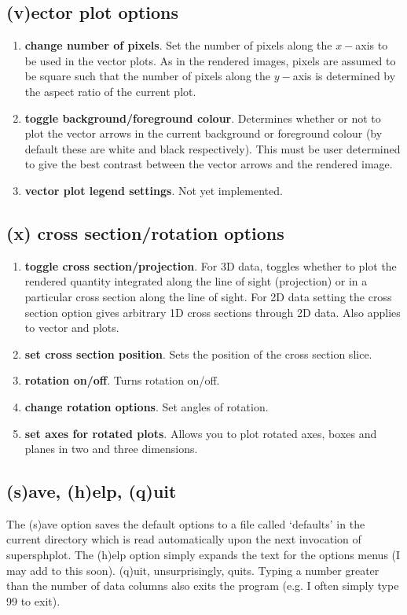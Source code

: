 \documentclass[a4paper,11pt]{article}
\begin{document}
\subsection{(v)ector plot options}
\begin{enumerate}
\item \textbf{change number of pixels}. Set the number of pixels along the
$x-$axis to be used in the vector plots. As in the rendered images, pixels are assumed to be square such that the number of pixels along
the $y-$axis is determined by the aspect ratio of the current plot.
\item \textbf{toggle background/foreground colour}. Determines whether or not to
plot the vector arrows in the current background or foreground colour (by
default these are white and black respectively). This must
be user determined to give the best contrast between the vector arrows and the
rendered image.
\item \textbf{vector plot legend settings}. Not yet implemented.
\end{enumerate}

\subsection{(x) cross section/rotation options}
\begin{enumerate}
\item \textbf{toggle cross section/projection}. For 3D data, toggles whether to
plot the rendered quantity integrated along the line of sight (projection) or in
a particular cross section along the line of sight. For 2D data setting the
cross section option gives arbitrary 1D cross sections through 2D data. Also applies to vector and plots.
\item \textbf{set cross section position}. Sets the position of the cross section slice.
\item \textbf{rotation on/off}. Turns rotation on/off.
\item \textbf{change rotation options}. Set angles of rotation.
\item \textbf{set axes for rotated plots}. Allows you to plot rotated axes, boxes and planes
in two and three dimensions.
\end{enumerate}

\subsection{(s)ave, (h)elp, (q)uit}
 The (s)ave option saves the default options to a file called `defaults' in the
current directory which is read automatically upon the next invocation of
supersphplot. The (h)elp option simply expands the text for the options menus (I
may add to this soon). (q)uit, unsurprisingly, quits. Typing a number greater than the number of
data columns also exits the program (e.g. I often simply type 99 to exit).
\end{document}
